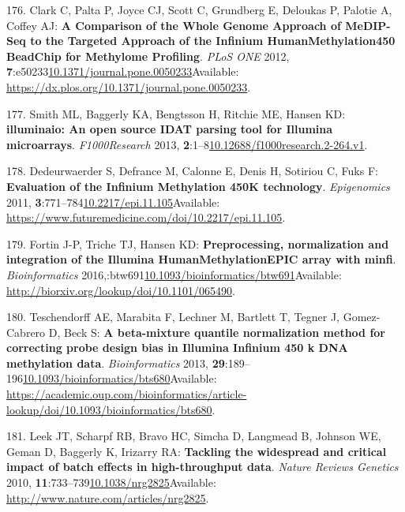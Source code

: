 \documentclass[
]{book}
\begin{document}
\leavevmode\hypertarget{ref-Clark2012}{}%
176. Clark C, Palta P, Joyce CJ, Scott C, Grundberg E, Deloukas P, Palotie A, Coffey AJ: \textbf{A Comparison of the Whole Genome Approach of MeDIP-Seq to the Targeted Approach of the Infinium HumanMethylation450 BeadChip for Methylome Profiling}. \emph{PLoS ONE} 2012, \textbf{7}:e50233\href{https://doi.org/10.1371/journal.pone.0050233}{10.1371/journal.pone.0050233}Available: \url{https://dx.plos.org/10.1371/journal.pone.0050233}.

\leavevmode\hypertarget{ref-Smith2013}{}%
177. Smith ML, Baggerly KA, Bengtsson H, Ritchie ME, Hansen KD: \textbf{illuminaio: An open source IDAT parsing tool for Illumina microarrays}. \emph{F1000Research} 2013, \textbf{2}:1--8\href{https://doi.org/10.12688/f1000research.2-264.v1}{10.12688/f1000research.2-264.v1}.

\leavevmode\hypertarget{ref-Dedeurwaerder2011}{}%
178. Dedeurwaerder S, Defrance M, Calonne E, Denis H, Sotiriou C, Fuks F: \textbf{Evaluation of the Infinium Methylation 450K technology}. \emph{Epigenomics} 2011, \textbf{3}:771--784\href{https://doi.org/10.2217/epi.11.105}{10.2217/epi.11.105}Available: \url{https://www.futuremedicine.com/doi/10.2217/epi.11.105}.

\leavevmode\hypertarget{ref-Fortin2016}{}%
179. Fortin J-P, Triche TJ, Hansen KD: \textbf{Preprocessing, normalization and integration of the Illumina HumanMethylationEPIC array with minfi}. \emph{Bioinformatics} 2016,:btw691\href{https://doi.org/10.1093/bioinformatics/btw691}{10.1093/bioinformatics/btw691}Available: \url{http://biorxiv.org/lookup/doi/10.1101/065490}.

\leavevmode\hypertarget{ref-Teschendorff2013}{}%
180. Teschendorff AE, Marabita F, Lechner M, Bartlett T, Tegner J, Gomez-Cabrero D, Beck S: \textbf{A beta-mixture quantile normalization method for correcting probe design bias in Illumina Infinium 450 k DNA methylation data}. \emph{Bioinformatics} 2013, \textbf{29}:189--196\href{https://doi.org/10.1093/bioinformatics/bts680}{10.1093/bioinformatics/bts680}Available: \url{https://academic.oup.com/bioinformatics/article-lookup/doi/10.1093/bioinformatics/bts680}.

\leavevmode\hypertarget{ref-Leek2010}{}%
181. Leek JT, Scharpf RB, Bravo HC, Simcha D, Langmead B, Johnson WE, Geman D, Baggerly K, Irizarry RA: \textbf{Tackling the widespread and critical impact of batch effects in high-throughput data}. \emph{Nature Reviews Genetics} 2010, \textbf{11}:733--739\href{https://doi.org/10.1038/nrg2825}{10.1038/nrg2825}Available: \url{http://www.nature.com/articles/nrg2825}.
\end{document}
